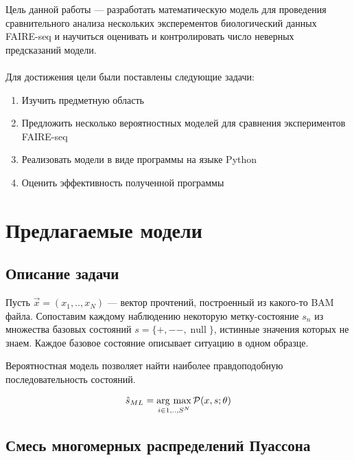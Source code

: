 \documentclass{matmex-diploma-custom}
\begin{document}
Цель данной работы --- разработать математическую модель для проведения сравнительного анализа нескольких эксперементов биологический данных FAIRE-seq и научиться оценивать и контролировать число неверных предсказаний модели. 
\\\\
Для достижения цели были поставлены следующие задачи:
\begin{enumerate}
\item
Изучить предметную область
\item
Предложить несколько вероятностных моделей для сравнения экспериментов FAIRE-seq
\item
Реализовать модели в виде программы на языке Python
\item
Оценить эффективность полученной программы
\end{enumerate}

\section{Предлагаемые модели}
\subsection{Описание задачи}

Пусть $\vec{x}=(x_1,..,x_N)$ --- вектор прочтений, построенный из какого-то BAM файла.
Сопоставим каждому наблюдению некоторую метку-состояние $s_n$ из множества базовых состояний $s=\{+, --, \operatorname{null}\}$, истинные значения которых не знаем. Каждое базовое состояние описывает ситуацию в одном образце.

Вероятностная модель позволяет найти наиболее правдоподобную последовательность состояний.

\newcommand{\argmax}{\mathop{\rm arg~max}\limits}
$$\hat{s}_{ML} = \argmax_{i \in {1,..,S}^N} \mathcal{P}(x,s;\theta)$$

\subsection{Смесь многомерных распределений Пуассона}


\end{document}
